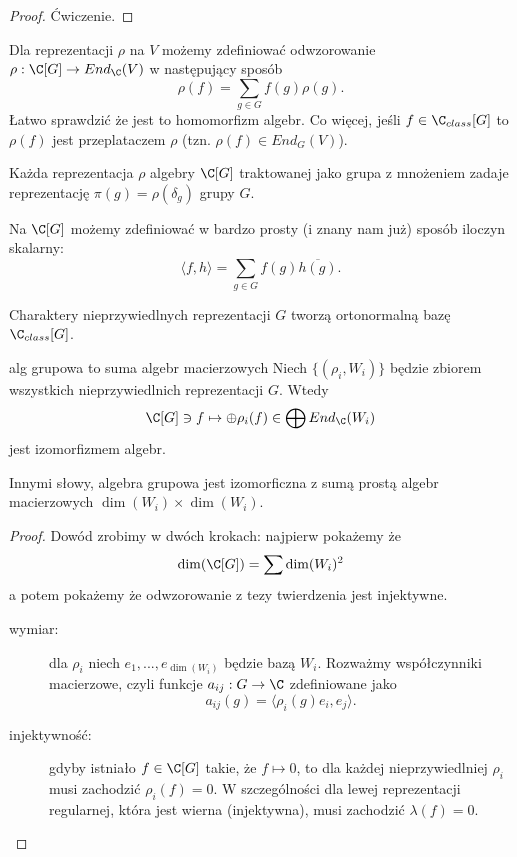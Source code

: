 \begin{proof}
  Ćwiczenie.
\end{proof}

Dla reprezentacji $\rho$ na $V$ możemy zdefiniować odwzorowanie $\rho:\C[G]\to End_\C(V)$ w następujący sposób
$$\rho(f)=\sum_{g\in G}f(g)\rho(g).$$
Łatwo sprawdzić że jest to homomorfizm algebr. Co więcej, jeśli $f\in \C_{class}[G]$ to $\rho(f)$ jest przeplataczem $\rho$ (tzn. $\rho(f)\in End_G(V)$).

\begin{lemma}{}{}
  Każda reprezentacja $\rho$ algebry $\C[G]$ traktowanej jako grupa z mnożeniem zadaje reprezentację $\pi(g)=\rho(\delta_g)$ grupy $G$.
\end{lemma}

Na $\C[G]$ możemy zdefiniować w bardzo prosty (i znany nam już) sposób iloczyn skalarny:
$$\langle f,h\rangle=\sum_{g\in G}f(g)\overline{h(g)}.$$

\begin{theorem}{}{}
  Charaktery nieprzywiedlnych reprezentacji $G$ tworzą ortonormalną bazę $\C_{class}[G]$.
\end{theorem}

\begin{theorem}{}{alg grupowa to suma algebr macierzowych}
  Niech $\{(\rho_i, W_i)\}$ będzie zbiorem wszystkich nieprzywiedlnich reprezentacji $G$. Wtedy
  $$\C[G]\ni f\mapsto \oplus \rho_i(f)\in \bigoplus End_\C(W_i)$$
  jest izomorfizmem algebr.
\end{theorem}

Innymi słowy, algebra grupowa jest izomorficzna z sumą prostą algebr macierzowych $\dim(W_i)\times\dim(W_i)$.

\begin{proof}
  Dowód zrobimy w dwóch krokach: najpierw pokażemy że
  $$\dim(\C[G])=\sum \dim(W_i)^2$$
  a potem pokażemy że odwzorowanie z tezy twierdzenia jest injektywne.

  \begin{description}
    \item[wymiar:] dla $\rho_i$ niech $e_1,...,e_{\dim(W_i)}$ będzie bazą $W_i$. Rozważmy współczynniki macierzowe, czyli funkcje $a_{ij}:G\to\C$ zdefiniowane jako
      $$a_{ij}(g)=\langle\rho_i(g)e_i,e_j\rangle.$$
    \item[injektywność:] gdyby istniało $f\in \C[G]$ takie, że $f\mapsto 0$, to dla każdej nieprzywiedlniej $\rho_i$ musi zachodzić $\rho_i(f)=0$. W szczególności dla lewej reprezentacji regularnej, która jest wierna (injektywna), musi zachodzić $\lambda(f)=0$. 
  \end{description}
\end{proof}


